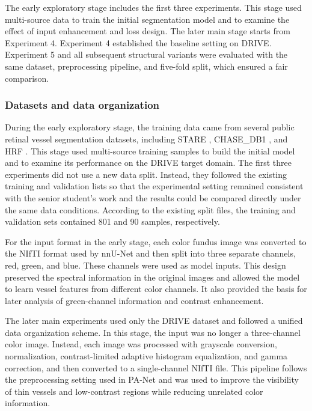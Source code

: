 \documentclass[a4paper,12pt]{article}
\begin{document}
The early exploratory stage includes the first three experiments. This stage used multi-source data to train the initial segmentation model and to examine the effect of input enhancement and loss design. The later main stage starts from Experiment 4. Experiment 4 established the baseline setting on DRIVE. Experiment 5 and all subsequent structural variants were evaluated with the same dataset, preprocessing pipeline, and five-fold split, which ensured a fair comparison.

\subsubsection{Datasets and data organization}

During the early exploratory stage, the training data came from several public retinal vessel segmentation datasets, including STARE \cite{hoover2000locating}, CHASE\_DB1 \cite{fraz2012ensemble}, and HRF \cite{budai2013robust}. This stage used multi-source training samples to build the initial model and to examine its performance on the DRIVE target domain. The first three experiments did not use a new data split. Instead, they followed the existing training and validation lists so that the experimental setting remained consistent with the senior student's work and the results could be compared directly under the same data conditions. According to the existing split files, the training and validation sets contained 801 and 90 samples, respectively.

For the input format in the early stage, each color fundus image was converted to the NIfTI format used by nnU-Net and then split into three separate channels, red, green, and blue. These channels were used as model inputs. This design preserved the spectral information in the original images and allowed the model to learn vessel features from different color channels. It also provided the basis for later analysis of green-channel information and contrast enhancement.

The later main experiments used only the DRIVE dataset and followed a unified data organization scheme. In this stage, the input was no longer a three-channel color image. Instead, each image was processed with grayscale conversion, normalization, contrast-limited adaptive histogram equalization, and gamma correction, and then converted to a single-channel NIfTI file. This pipeline follows the preprocessing setting used in PA-Net \cite{luo2025panet} and was used to improve the visibility of thin vessels and low-contrast regions while reducing unrelated color information.
\end{document}
